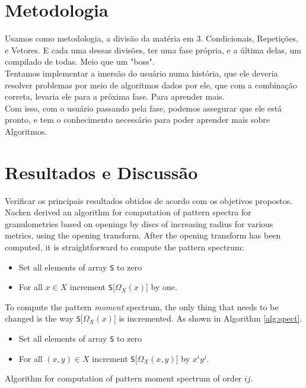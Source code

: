 \documentclass{sciposter}
\begin{document}
\begin{multicols}{3}
\section{Metodologia}
Usamos como metodologia, a divisão da matéria em 3. Condicionais, Repetições, e Vetores. E cada uma dessas divisões, ter uma fase própria, e a última delas, um compilado de todas. Meio que um "boss".\\
Tentamos implementar a imersão do usuário numa história, que ele deveria resolver problemas por meio de algoritmos dados por ele, que com a combinação correta, levaria ele para a próxima fase. Para aprender mais.\\
Com isso, com o usuário passando pela fase, podemos assegurar que ele está pronto, e tem o conhecimento necessário para poder aprender mais sobre Algoritmos.\\

\section{Resultados e Discussão}

Verificar os principais resultados obtidos de acordo com os objetivos propostos.\\

Nacken \cite{Nacken:thesis} derived an algorithm for computation
of pattern spectra for granulometries based on openings by discs of increasing
radius for various metrics, using the opening transform. After the
opening transform has been computed, it is straightforward to compute the 
pattern spectrum:
\begin{itemize}
\item Set all elements of array {\tt S} to zero
\item For all $x \in X$ increment {\tt S}[$\Omega_X(x)$] by one. 
\end{itemize}

To compute the pattern \emph{moment} spectrum, the only thing that needs to be
changed is the way {\tt S}[$\Omega_X(x)$] is incremented. As shown in Algorithm
\ref{alg:spect}.

\begin{algorithm}
\begin{itemize}
\item Set all elements of array {\tt S} to zero
\item For all $(x,y) \in X$ increment {\tt S}[$\Omega_X(x,y)$] by 
$x^iy^j$. 
\end{itemize}
\caption{ Algorithm for computation of pattern moment
spectrum of order $ij$. \label{alg:spect}}
\end{algorithm}


\end{multicols}
\end{document}
